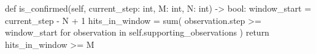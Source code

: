\begin{pythoncode}
def is_confirmed(self, current_step: int, M: int, N: int) -> bool:
    window_start = current_step - N + 1
    hits_in_window = sum(
        observation.step >= window_start
        for observation in self.supporting_observations
    )
    return hits_in_window >= M
\end{pythoncode}
